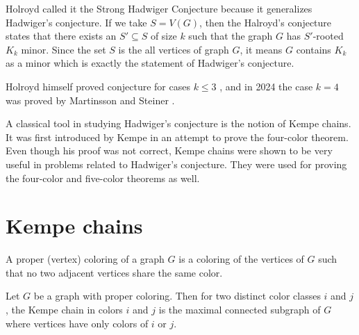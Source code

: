Holroyd called it the Strong Hadwiger Conjecture because it generalizes Hadwiger's conjecture. If we take $S = V(G)$,
then the Halroyd's conjecture states that there exists an $S' \subseteq S$ of size $k$ such that the graph $G$ has $S'$-rooted $K_k$ minor. 
Since the set $S$ is the all vertices of graph $G$, it means $G$ contains $K_k$ as a minor
which is exactly the statement of Hadwiger's conjecture.

Holroyd himself proved conjecture for cases $k \leq 3$ \cite{Holroyd1997}, and in 2024  the case
$k = 4$ was proved by Martinsson and Steiner \cite{MARTINSSON20241}.

A classical tool in studying Hadwiger's conjecture is the notion of Kempe chains. It was first introduced by Kempe in an attempt
to prove the four-color theorem. Even though his proof was not correct, Kempe chains were shown to be very useful in problems 
related to Hadwiger’s conjecture. They were used for proving the four-color and five-color theorems as well.

\section{Kempe chains}

\begin{defn}
    A proper (vertex) coloring of a graph $G$ is a coloring of the vertices of $G$ such that no two adjacent vertices
    share the same color.
\end{defn}


\begin{defn}
 Let $G$ be a graph with proper coloring. Then for two distinct color classes $i$ and $j$, the Kempe chain 
 in colors $i$ and $j$ is the maximal connected subgraph of $G$ where vertices have only colors of $i$ or $j$.
\end{defn}

